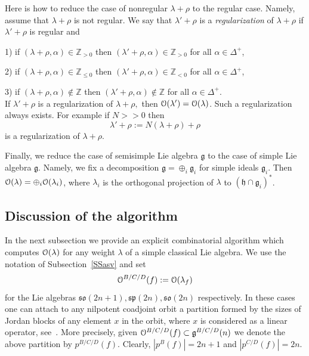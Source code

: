\documentclass{emsprocart}
\begin{document}
Here is how to reduce the case of nonregular $\lambda+\rho$ to the regular case. Namely, assume that $\lambda+\rho$ is not regular. We say that $\lambda'+\rho$ is a {\it regularization} of $\lambda+\rho$ if $\lambda'+\rho$ is regular and

1) if $(\lambda+\rho, \alpha)\in\mathbb Z_{>0}$ then $(\lambda'+\rho, \alpha)\in\mathbb Z_{>0}$ for all $\alpha\in\Delta^+$,

2) if $(\lambda+\rho, \alpha)\in\mathbb Z_{\le 0}$ then $(\lambda'+\rho, \alpha)\in\mathbb Z_{<0}$ for all $\alpha\in\Delta^+$,

3) if $(\lambda+\rho, \alpha)\not\in\mathbb Z$ then $(\lambda'+\rho, \alpha)\not\in\mathbb Z$ for all $\alpha\in\Delta^+$.\\
If $\lambda'+\rho$ is a regularization of $\lambda+\rho,$ then $\EuScript O(\lambda')=\EuScript O(\lambda)$. Such a regularization always exists. For example if $N>\!\!>0$ then  $$\lambda'+\rho:=N(\lambda+\rho)+\rho$$ is a regularization of $\lambda+\rho$.

Finally, we reduce the case of semisimple Lie algebra $\mathfrak g$ to the case of simple Lie algebra $\mathfrak g$. Namely, we fix a decomposition $\mathfrak g=\oplus_i\mathfrak g_i$ for simple ideals $\mathfrak g_i$. Then $\EuScript O(\lambda)=\oplus_i\EuScript O(\lambda_i)$, where $\lambda_i$ is the orthogonal projection of $\lambda$ to $(\mathfrak h\cap\mathfrak g_i)^*$.


\subsection{Discussion of the algorithm}
In the next subsection we provide an explicit combinatorial algorithm which computes $\EuScript O(\lambda)$ for any weight $\lambda$ of a simple classical Lie algebra. We use the notation of Subsection~\ref{SSasv} and set $$\EuScript O^{B/C/D}(f):=\EuScript O(\lambda_f)$$ for the Lie algebras $\mathfrak{so}(2n+1), \mathfrak{sp}(2n), \mathfrak{so}(2n)$ respectively. In these cases one can attach to any nilpotent coadjoint orbit a partition formed by the sizes of Jordan blocks of any element $x$ in the orbit, where $x$ is considered as a linear operator, see~\cite{CM}. More precisely, given $\EuScript O^{B/C/D}(f)\subset\mathfrak g^{B/C/D}(n)$ we denote the above partition by $p^{B/C/D}(f)$. Clearly, $|p^B(f)|=2n+1$ and $|p^{C/D}(f)|=2n$.
\end{document}
